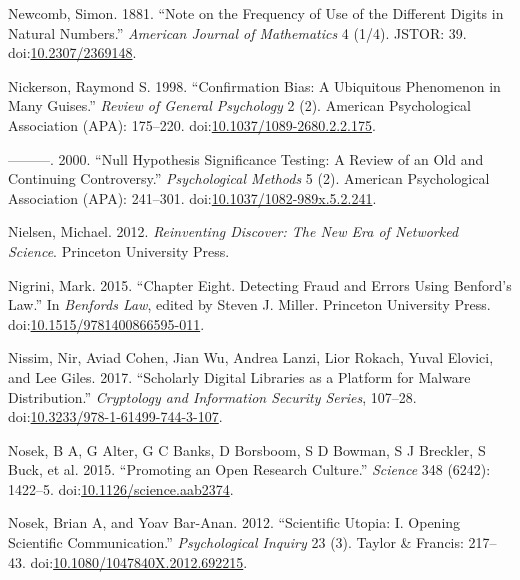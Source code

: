 \documentclass[a5paper]{book}
\begin{document}
\hypertarget{ref-doi:10.2307ux2f2369148}{}
Newcomb, Simon. 1881. ``Note on the Frequency of Use of the Different
Digits in Natural Numbers.'' \emph{American Journal of Mathematics} 4
(1/4). JSTOR: 39.
doi:\href{https://doi.org/10.2307/2369148}{10.2307/2369148}.

\hypertarget{ref-doi:10.1037ux2f1089-2680.2.2.175}{}
Nickerson, Raymond S. 1998. ``Confirmation Bias: A Ubiquitous Phenomenon
in Many Guises.'' \emph{Review of General Psychology} 2 (2). American
Psychological Association (APA): 175--220.
doi:\href{https://doi.org/10.1037/1089-2680.2.2.175}{10.1037/1089-2680.2.2.175}.

\hypertarget{ref-doi:10.1037ux2f1082-989X.5.2.241}{}
---------. 2000. ``Null Hypothesis Significance Testing: A Review of an
Old and Continuing Controversy.'' \emph{Psychological Methods} 5 (2).
American Psychological Association (APA): 241--301.
doi:\href{https://doi.org/10.1037/1082-989x.5.2.241}{10.1037/1082-989x.5.2.241}.

\hypertarget{ref-isbn:9780691148908}{}
Nielsen, Michael. 2012. \emph{Reinventing Discover: The New Era of
Networked Science}. Princeton University Press.

\hypertarget{ref-doi:10.1515ux2f9781400866595-011}{}
Nigrini, Mark. 2015. ``Chapter Eight. Detecting Fraud and Errors Using
Benford's Law.'' In \emph{Benfords Law}, edited by Steven J. Miller.
Princeton University Press.
doi:\href{https://doi.org/10.1515/9781400866595-011}{10.1515/9781400866595-011}.

\hypertarget{ref-doi:10.3233ux2f978-1-61499-744-3-107}{}
Nissim, Nir, Aviad Cohen, Jian Wu, Andrea Lanzi, Lior Rokach, Yuval
Elovici, and Lee Giles. 2017. ``Scholarly Digital Libraries as a
Platform for Malware Distribution.'' \emph{Cryptology and Information
Security Series}, 107--28.
doi:\href{https://doi.org/10.3233/978-1-61499-744-3-107}{10.3233/978-1-61499-744-3-107}.

\hypertarget{ref-doi:10.1126ux2fscience.aab2374}{}
Nosek, B A, G Alter, G C Banks, D Borsboom, S D Bowman, S J Breckler, S
Buck, et al. 2015. ``Promoting an Open Research Culture.''
\emph{Science} 348 (6242): 1422--5.
doi:\href{https://doi.org/10.1126/science.aab2374}{10.1126/science.aab2374}.

\hypertarget{ref-doi:10.1080ux2f1047840X.2012.692215}{}
Nosek, Brian A, and Yoav Bar-Anan. 2012. ``Scientific Utopia: I. Opening
Scientific Communication.'' \emph{Psychological Inquiry} 23 (3). Taylor
\& Francis: 217--43.
doi:\href{https://doi.org/10.1080/1047840X.2012.692215}{10.1080/1047840X.2012.692215}.
\end{document}
